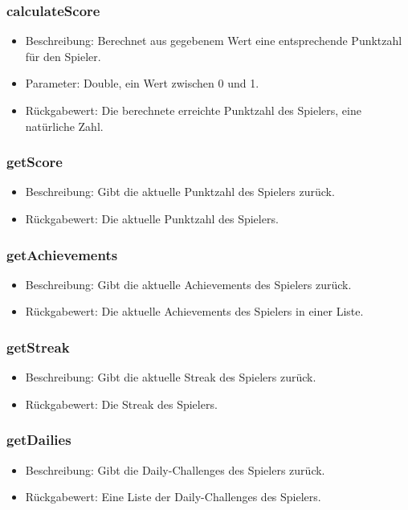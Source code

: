 \documentclass[a4paper]{scrreprt}
\begin{document}
	\subsubsection{calculateScore}
	\begin{itemize}
		\item Beschreibung: Berechnet aus gegebenem Wert eine entsprechende Punktzahl für den Spieler.
		\item Parameter: Double, ein Wert zwischen 0 und 1. 
		\item Rückgabewert: Die berechnete erreichte Punktzahl des Spielers, eine natürliche Zahl.
	\end{itemize}
	\subsubsection{getScore}
	\begin{itemize}
		\item Beschreibung: Gibt die aktuelle Punktzahl des Spielers zurück.
		\item Rückgabewert: Die aktuelle Punktzahl des Spielers.
	\end{itemize}
	\subsubsection{getAchievements}
	\begin{itemize}
		\item Beschreibung: Gibt die aktuelle Achievements des Spielers zurück.
		\item Rückgabewert: Die aktuelle Achievements des Spielers in einer Liste.
	\end{itemize}
	\subsubsection{getStreak}
	\begin{itemize}
		\item Beschreibung: Gibt die aktuelle Streak des Spielers zurück.
		\item Rückgabewert: Die Streak des Spielers.
	\end{itemize}
	\subsubsection{getDailies}
	\begin{itemize}
		\item Beschreibung: Gibt die Daily-Challenges des Spielers zurück.
		\item Rückgabewert: Eine Liste der Daily-Challenges des Spielers.
	\end{itemize}
\end{document}
